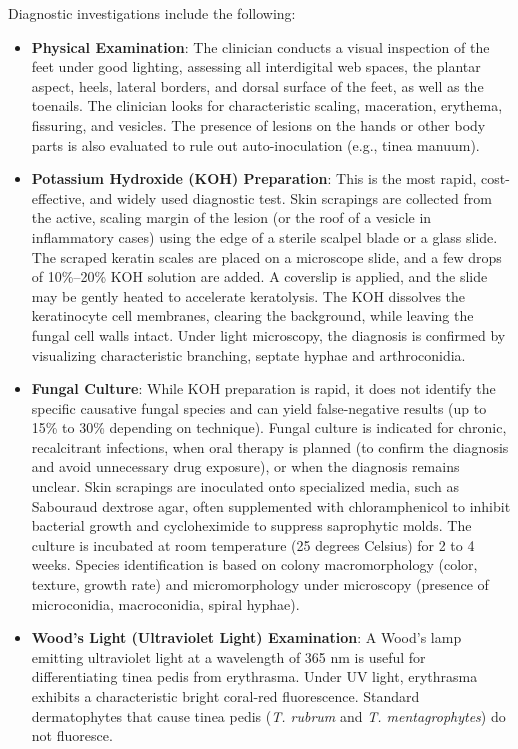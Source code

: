 Diagnostic investigations include the following:
\begin{itemize}
    \item \textbf{Physical Examination}: The clinician conducts a visual inspection of the feet under good lighting, assessing all interdigital web spaces, the plantar aspect, heels, lateral borders, and dorsal surface of the feet, as well as the toenails. The clinician looks for characteristic scaling, maceration, erythema, fissuring, and vesicles. The presence of lesions on the hands or other body parts is also evaluated to rule out auto-inoculation (e.g., tinea manuum).
    \item \textbf{Potassium Hydroxide (KOH) Preparation}: This is the most rapid, cost-effective, and widely used diagnostic test. Skin scrapings are collected from the active, scaling margin of the lesion (or the roof of a vesicle in inflammatory cases) using the edge of a sterile scalpel blade or a glass slide. The scraped keratin scales are placed on a microscope slide, and a few drops of 10\%--20\% KOH solution are added. A coverslip is applied, and the slide may be gently heated to accelerate keratolysis. The KOH dissolves the keratinocyte cell membranes, clearing the background, while leaving the fungal cell walls intact. Under light microscopy, the diagnosis is confirmed by visualizing characteristic branching, septate hyphae and arthroconidia.
    \item \textbf{Fungal Culture}: While KOH preparation is rapid, it does not identify the specific causative fungal species and can yield false-negative results (up to 15\% to 30\% depending on technique). Fungal culture is indicated for chronic, recalcitrant infections, when oral therapy is planned (to confirm the diagnosis and avoid unnecessary drug exposure), or when the diagnosis remains unclear. Skin scrapings are inoculated onto specialized media, such as Sabouraud dextrose agar, often supplemented with chloramphenicol to inhibit bacterial growth and cycloheximide to suppress saprophytic molds. The culture is incubated at room temperature (25 degrees Celsius) for 2 to 4 weeks. Species identification is based on colony macromorphology (color, texture, growth rate) and micromorphology under microscopy (presence of microconidia, macroconidia, spiral hyphae).
    \item \textbf{Wood's Light (Ultraviolet Light) Examination}: A Wood's lamp emitting ultraviolet light at a wavelength of 365 nm is useful for differentiating tinea pedis from erythrasma. Under UV light, erythrasma exhibits a characteristic bright coral-red fluorescence. Standard dermatophytes that cause tinea pedis (\textit{T. rubrum} and \textit{T. mentagrophytes}) do not fluoresce.

\end{itemize}
